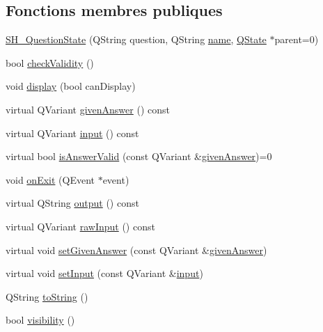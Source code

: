 \subsection*{Fonctions membres publiques}
\begin{DoxyCompactItemize}
\item 
\hyperlink{classSH__QuestionState_ad7ea575ec284d1dc89da5df9f31cd751}{S\-H\-\_\-\-Question\-State} (Q\-String question, Q\-String \hyperlink{classSH__NamedObject_a970f265df31b28b2179bbbceb6170ac2}{name}, \hyperlink{classQState}{Q\-State} $\ast$parent=0)
\item 
bool \hyperlink{classSH__QuestionState_a3ca5459c20ef591023c0572d8224146c}{check\-Validity} ()
\item 
void \hyperlink{classSH__InOutState_a918e8a7f5fe00dc16004e46eeee1281d}{display} (bool can\-Display)
\item 
virtual Q\-Variant \hyperlink{classSH__QuestionState_abde97c61175be95358ece622fd16593e}{given\-Answer} () const 
\item 
virtual Q\-Variant \hyperlink{classSH__InOutState_a04364c76d2fd8a3781e7b325955e5bd9}{input} () const 
\item 
virtual bool \hyperlink{classSH__QuestionState_ac195d7ad87a52ab276a7c4a902eab691}{is\-Answer\-Valid} (const Q\-Variant \&\hyperlink{classSH__QuestionState_abde97c61175be95358ece622fd16593e}{given\-Answer})=0
\item 
void \hyperlink{classSH__InOutState_a36636cba0d68476288bce5fd4c041db0}{on\-Exit} (Q\-Event $\ast$event)
\item 
virtual Q\-String \hyperlink{classSH__InOutState_a1a2fd4f34484125058e20730aaee7e46}{output} () const 
\item 
virtual Q\-Variant \hyperlink{classSH__InOutState_a4b1ca094de91c47690ec2d1e95678273}{raw\-Input} () const 
\item 
virtual void \hyperlink{classSH__QuestionState_a9d285a34a7002fd05a7fa8ff9139c264}{set\-Given\-Answer} (const Q\-Variant \&\hyperlink{classSH__QuestionState_abde97c61175be95358ece622fd16593e}{given\-Answer})
\item 
virtual void \hyperlink{classSH__QuestionState_a331222d371d9c97392f35c84a5ef43e1}{set\-Input} (const Q\-Variant \&\hyperlink{classSH__InOutState_a04364c76d2fd8a3781e7b325955e5bd9}{input})
\item 
Q\-String \hyperlink{classSH__GenericState_a5480c5ee725fd801d8f6292cd4c803b8}{to\-String} ()
\item 
bool \hyperlink{classSH__InOutState_a8c496b2fe21a51a587c6e4409c0f37ec}{visibility} ()
\end{DoxyCompactItemize}
